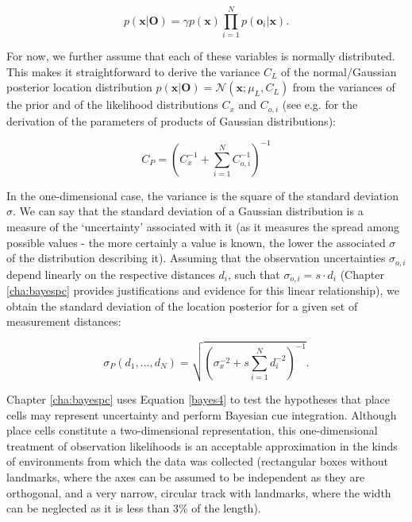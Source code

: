 \begin{equation}\label{bayes2}
p( \bm x | \bm O ) = \gamma p( \bm x ) \prod_{i=1}^{N} p( \bm o_i | \bm x ).
\end{equation}

For now, we further assume that each of these variables is normally distributed. This makes it straightforward to derive the variance $C_L$ of the normal/Gaussian posterior location distribution $p( \bm x | \bm O ) = \mathcal{N}(\bm x ; \mu_L, C_L)$ from the variances of the prior and of the likelihood distributions $C_x$ and $C_{o,i}$ (see e.g. \cite{wu2004properties} for the derivation of the parameters of products of Gaussian distributions):

\begin{equation}\label{bayes3}
C_{P}=(C_x^{-1}+\sum_{i=1}^{N} C_{o,i}^{-1})^{-1}
\end{equation}

In the one-dimensional case, the variance is the square of the standard deviation $\sigma$. We can say that the standard deviation of a Gaussian distribution is a measure of the `uncertainty' associated with it (as it measures the spread among possible values - the more certainly a value is known, the lower the associated $\sigma$ of the distribution describing it). Assuming that the observation uncertainties $\sigma_{o,i}$ depend linearly on the respective distances $d_{i}$, such that $\sigma_{o,i}=s \cdot d_{i}$ (Chapter \ref{cha:bayespc} provides justifications and evidence for this linear relationship), we obtain the standard deviation of the location posterior for a given set of measurement distances:

\begin{equation}\label{bayes4}
\sigma_{P}(d_1, ..., d_N)=\sqrt{(\sigma_x^{-2}+s \sum_{i=1}^{N} d_{i}^{-2})^{-1}}.
\end{equation}

Chapter \ref{cha:bayespc} uses Equation \ref{bayes4} to test the hypotheses that place cells may represent uncertainty and perform Bayesian cue integration. Although place cells constitute a two-dimensional representation, this one-dimensional treatment of observation likelihoods is an acceptable approximation in the kinds of environments from which the data was collected (rectangular boxes without landmarks, where the axes can be assumed to be independent as they are orthogonal, and a very narrow, circular track with landmarks, where the width can be neglected as it is less than $3\%$ of the length). 



